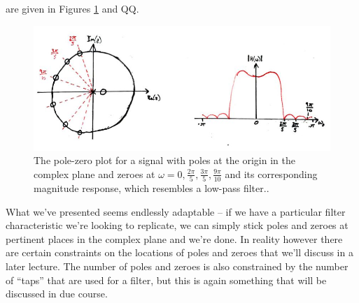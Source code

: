are given in Figures \ref{fig::lecture_9_poles_zeroes_example_2} and QQ.
%
\begin{figure}[!htb]
  \includegraphics[width=\textwidth]{images/lecture_9_poles_zeroes_example_2.JPG}
  \caption{
    The pole-zero plot for a signal with poles at the origin in the complex plane
    and zeroes at $\omega = 0, \frac{2\pi}{5}, \frac{3\pi}{5}, \frac{9\pi}{10}$
    and its corresponding magnitude response, which resembles a low-pass filter..
  }
  \label{fig::lecture_9_poles_zeroes_example_2}
\end{figure}
%
What we've presented seems endlessly adaptable -- if we have a particular
filter characteristic we're looking to replicate, we can simply stick poles
and zeroes at pertinent places in the complex plane and we're done. In reality
however there are certain constraints on the locations of poles and zeroes
that we'll discuss in a later lecture. The number of poles and zeroes is also
constrained by the number of ``taps'' that are used for a filter, but this is
again something that will be discussed in due course.
